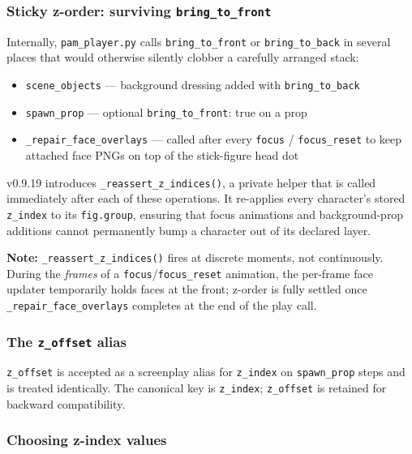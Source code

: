 \documentclass[
  11pt,
]{book}
\providecommand{\tightlist}{%
  \setlength{\itemsep}{0pt}\setlength{\parskip}{0pt}}
\begin{document}
\subsubsection{Sticky z-order: surviving \texttt{bring\_to\_front}}\label{sticky-z-order}

Internally, \texttt{pam\_player.py} calls \texttt{bring\_to\_front} or
\texttt{bring\_to\_back} in several places that would otherwise silently
clobber a carefully arranged stack:

\begin{itemize}
\tightlist
\item
  \texttt{scene\_objects} --- background dressing added with
  \texttt{bring\_to\_back}
\item
  \texttt{spawn\_prop} --- optional \texttt{bring\_to\_front}: true on a
  prop
\item
  \texttt{\_repair\_face\_overlays} --- called after every
  \texttt{focus} / \texttt{focus\_reset} to keep attached face PNGs on
  top of the stick-figure head dot
\end{itemize}

v0.9.19 introduces \texttt{\_reassert\_z\_indices()}, a private helper
that is called immediately after each of these operations. It re-applies
every character's stored \texttt{z\_index} to its \texttt{fig.group},
ensuring that focus animations and background-prop additions cannot
permanently bump a character out of its declared layer.

\textbf{Note:} \texttt{\_reassert\_z\_indices()} fires at discrete
moments, not continuously. During the \emph{frames} of a
\texttt{focus}/\texttt{focus\_reset} animation, the per-frame face
updater temporarily holds faces at the front; z-order is fully settled
once \texttt{\_repair\_face\_overlays} completes at the end of the play
call.

\subsubsection{The \texttt{z\_offset} alias}\label{z-offset-alias}

\texttt{z\_offset} is accepted as a screenplay alias for \texttt{z\_index}
on \texttt{spawn\_prop} steps and is treated identically. The canonical
key is \texttt{z\_index}; \texttt{z\_offset} is retained for backward
compatibility.

\subsubsection{Choosing z-index values}\label{choosing-z-index-values}
\end{document}
